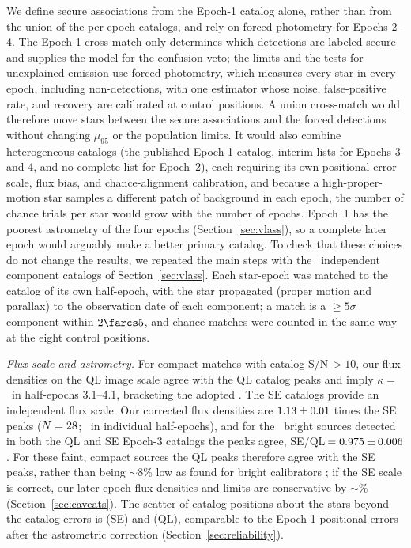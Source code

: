 \documentclass[linenumbers]{aastex702}
\begin{document}
We define secure associations from the Epoch-1 catalog alone, rather than from the union of the per-epoch catalogs, and rely on forced photometry for Epochs 2--4. The Epoch-1 cross-match only determines which detections are labeled secure and supplies the model for the confusion veto; the limits and the tests for unexplained emission use forced photometry, which measures every star in every epoch, including non-detections, with one estimator whose noise, false-positive rate, and recovery are calibrated at control positions. A union cross-match would therefore move stars between the secure associations and the forced detections without changing $\mu_{95}$ or the population limits. It would also combine heterogeneous catalogs (the published Epoch-1 catalog, interim lists for Epochs 3 and 4, and no complete list for Epoch~2), each requiring its own positional-error scale, flux bias, and chance-alignment calibration, and because a high-proper-motion star samples a different patch of background in each epoch, the number of chance trials per star would grow with the number of epochs. Epoch~1 has the poorest astrometry of the four epochs (Section~\ref{sec:vlass}), so a complete later epoch would arguably make a better primary catalog. To check that these choices do not change the results, we repeated the main steps with the \XcNCat\ independent component catalogs of Section~\ref{sec:vlass}. Each star-epoch was matched to the catalog of its own half-epoch, with the star propagated (proper motion and parallax) to the observation date of each component; a match is a $\ge5\sigma$ component within $2\farcs5$, and chance matches were counted in the same way at the eight control positions.

\emph{Flux scale and astrometry.} For compact matches with catalog S/N\,$>10$, our flux densities on the QL image scale agree with the QL catalog peaks and imply $\kappa=$\,\XcKappaRange\ in half-epochs 3.1--4.1, bracketing the adopted \KappaInj. The SE catalogs provide an independent flux scale. Our corrected flux densities are $1.13\pm0.01$ times the SE peaks ($N=28$; \XcSEratioRange\ in individual half-epochs), and for the \XcSEoverQLN\ bright sources detected in both the QL and SE Epoch-3 catalogs the peaks agree, SE/QL\,$=0.975\pm0.006$. For these faint, compact sources the QL peaks therefore agree with the SE peaks, rather than being $\sim$8\% low as found for bright calibrators \citep{Kimball2026}; if the SE scale is correct, our later-epoch flux densities and limits are conservative by $\sim$\XcSEcons\% (Section~\ref{sec:caveats}). The scatter of catalog positions about the stars beyond the catalog errors is \XcAstSE (SE) and \XcAstQL (QL), comparable to the Epoch-1 positional errors after the astrometric correction (Section~\ref{sec:reliability}).
\end{document}
